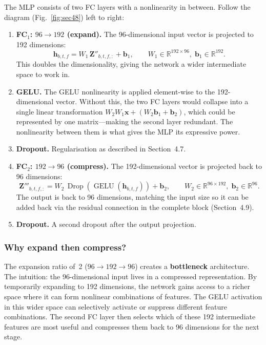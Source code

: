 \documentclass[11pt,a4paper]{article}
\DeclareMathOperator{\GELU}{GELU}
\DeclareMathOperator{\Drop}{Drop}
\begin{document}
	The MLP consists of two FC layers with a nonlinearity in between.  Follow the diagram (Fig.~\ref{fig:sec48}) left to right:
	
	\begin{enumerate}[nosep]
		\item \textbf{FC$_1$: $96 \to 192$ (expand).}  The 96-dimensional input vector is projected to 192 dimensions:
		\begin{equation}
			\mathbf{h}_{b,t,f} = W_1\,\mathbf{Z}''_{b,t,f,:} + \mathbf{b}_1, \qquad W_1 \in \mathbb{R}^{192 \times 96},\; \mathbf{b}_1 \in \mathbb{R}^{192}.
			\label{eq:mlp_fc1}
		\end{equation}
		This doubles the dimensionality, giving the network a wider intermediate space to work in.
		
		\item \textbf{GELU.}  The GELU nonlinearity is applied element-wise to the 192-dimensional vector.  Without this, the two FC layers would collapse into a single linear transformation $W_2 W_1 \mathbf{x} + (W_2 \mathbf{b}_1 + \mathbf{b}_2)$, which could be represented by one matrix---making the second layer redundant.  The nonlinearity between them is what gives the MLP its expressive power.
		
		\item \textbf{Dropout.}  Regularisation as described in Section~4.7.
		
		\item \textbf{FC$_2$: $192 \to 96$ (compress).}  The 192-dimensional vector is projected back to 96 dimensions:
		\begin{equation}
			\mathbf{Z}'''_{b,t,f,:} = W_2\,\Drop(\GELU(\mathbf{h}_{b,t,f})) + \mathbf{b}_2, \qquad W_2 \in \mathbb{R}^{96 \times 192},\; \mathbf{b}_2 \in \mathbb{R}^{96}.
			\label{eq:mlp_fc2}
		\end{equation}
		The output is back to 96 dimensions, matching the input size so it can be added back via the residual connection in the complete block (Section~4.9).
		
		\item \textbf{Dropout.}  A second dropout after the output projection.
	\end{enumerate}
	
	\subsubsection*{Why expand then compress?}
	
	The expansion ratio of~2 ($96 \to 192 \to 96$) creates a \textbf{bottleneck} architecture.  The intuition: the 96-dimensional input lives in a compressed representation.  By temporarily expanding to 192 dimensions, the network gains access to a richer space where it can form nonlinear combinations of features.  The GELU activation in this wider space can selectively activate or suppress different feature combinations.  The second FC layer then selects which of these 192 intermediate features are most useful and compresses them back to 96 dimensions for the next stage.
	
\end{document}
